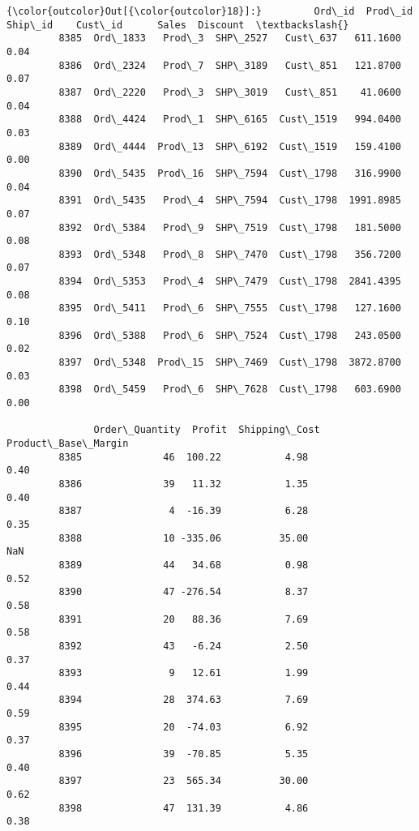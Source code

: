 \documentclass[11pt]{article}
\begin{document}
\begin{Verbatim}[commandchars=\\\{\}]
{\color{outcolor}Out[{\color{outcolor}18}]:}         Ord\_id  Prod\_id   Ship\_id    Cust\_id      Sales  Discount  \textbackslash{}
         8385  Ord\_1833   Prod\_3  SHP\_2527   Cust\_637   611.1600      0.04   
         8386  Ord\_2324   Prod\_7  SHP\_3189   Cust\_851   121.8700      0.07   
         8387  Ord\_2220   Prod\_3  SHP\_3019   Cust\_851    41.0600      0.04   
         8388  Ord\_4424   Prod\_1  SHP\_6165  Cust\_1519   994.0400      0.03   
         8389  Ord\_4444  Prod\_13  SHP\_6192  Cust\_1519   159.4100      0.00   
         8390  Ord\_5435  Prod\_16  SHP\_7594  Cust\_1798   316.9900      0.04   
         8391  Ord\_5435   Prod\_4  SHP\_7594  Cust\_1798  1991.8985      0.07   
         8392  Ord\_5384   Prod\_9  SHP\_7519  Cust\_1798   181.5000      0.08   
         8393  Ord\_5348   Prod\_8  SHP\_7470  Cust\_1798   356.7200      0.07   
         8394  Ord\_5353   Prod\_4  SHP\_7479  Cust\_1798  2841.4395      0.08   
         8395  Ord\_5411   Prod\_6  SHP\_7555  Cust\_1798   127.1600      0.10   
         8396  Ord\_5388   Prod\_6  SHP\_7524  Cust\_1798   243.0500      0.02   
         8397  Ord\_5348  Prod\_15  SHP\_7469  Cust\_1798  3872.8700      0.03   
         8398  Ord\_5459   Prod\_6  SHP\_7628  Cust\_1798   603.6900      0.00   
         
               Order\_Quantity  Profit  Shipping\_Cost  Product\_Base\_Margin  
         8385              46  100.22           4.98                 0.40  
         8386              39   11.32           1.35                 0.40  
         8387               4  -16.39           6.28                 0.35  
         8388              10 -335.06          35.00                  NaN  
         8389              44   34.68           0.98                 0.52  
         8390              47 -276.54           8.37                 0.58  
         8391              20   88.36           7.69                 0.58  
         8392              43   -6.24           2.50                 0.37  
         8393               9   12.61           1.99                 0.44  
         8394              28  374.63           7.69                 0.59  
         8395              20  -74.03           6.92                 0.37  
         8396              39  -70.85           5.35                 0.40  
         8397              23  565.34          30.00                 0.62  
         8398              47  131.39           4.86                 0.38  
\end{Verbatim}
            

    
    
    
    
\end{document}
